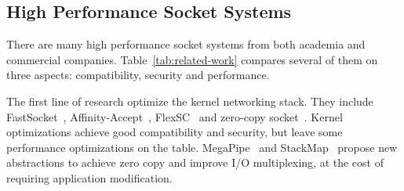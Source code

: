 




\subsection{High Performance Socket Systems}
\label{subsec:related-work}


There are many high performance socket systems from both academia and commercial companies.
Table~\ref{tab:related-work} compares several of them on three aspects: compatibility, security and performance.  

The first line of research optimize the kernel networking stack. They include FastSocket~\cite{lin2016scalable}, Affinity-Accept~\cite{pesterev2012improving}, FlexSC~\cite{soares2010flexsc} and zero-copy socket~\cite{thadani1995efficient,chu1996zero,linux-zero-copy}.
Kernel optimizations achieve good compatibility and security, but leave some performance optimizations on the table.
MegaPipe~\cite{han2012megapipe} and StackMap~\cite{yasukata2016stackmap} propose new abstractions to achieve zero copy and improve I/O multiplexing, at the cost of requiring application modification.

